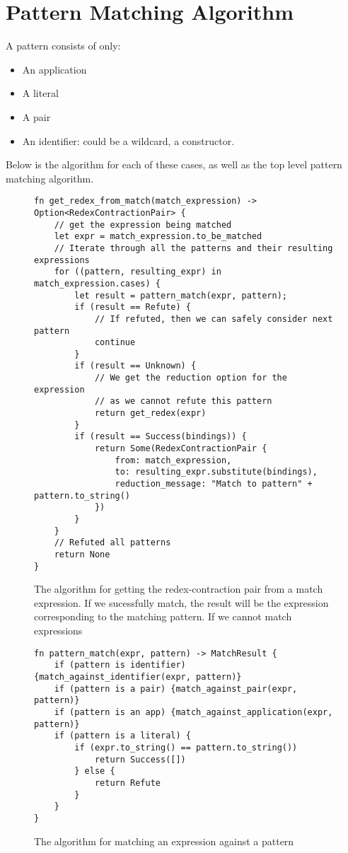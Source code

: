 \chapter{Pattern Matching Algorithm}
\label{appx:pattern_match}
A pattern consists of only:
\begin{itemize}
    \item An application
    \item A literal
    \item A pair
    \item An identifier: could be a wildcard, a constructor.
\end{itemize}

Below is the algorithm for each of these cases, as well as the top level pattern matching algorithm. 

\begin{figure}[h]
    \begin{lstlisting}[language=Rust_boxed]
fn get_redex_from_match(match_expression) -> Option<RedexContractionPair> {
    // get the expression being matched
    let expr = match_expression.to_be_matched
    // Iterate through all the patterns and their resulting expressions
    for ((pattern, resulting_expr) in match_expression.cases) {
        let result = pattern_match(expr, pattern);
        if (result == Refute) {
            // If refuted, then we can safely consider next pattern
            continue
        }
        if (result == Unknown) {
            // We get the reduction option for the expression
            // as we cannot refute this pattern
            return get_redex(expr)
        }
        if (result == Success(bindings)) {
            return Some(RedexContractionPair {
                from: match_expression,
                to: resulting_expr.substitute(bindings),
                reduction_message: "Match to pattern" + pattern.to_string()
            })
        }
    }
    // Refuted all patterns
    return None
}
\end{lstlisting}
    \caption{The algorithm for getting the redex-contraction pair from a match expression. If we sucessfully match, the result will be the expression corresponding to the matching pattern. If we cannot match expressions}
    \label{fig:all_pattern_list_iterate}
\end{figure}

\begin{figure}[h]
    \begin{lstlisting}[language=Rust_boxed]
fn pattern_match(expr, pattern) -> MatchResult {
    if (pattern is identifier) {match_against_identifier(expr, pattern)}
    if (pattern is a pair) {match_against_pair(expr, pattern)}
    if (pattern is an app) {match_against_application(expr, pattern)}
    if (pattern is a literal) {
        if (expr.to_string() == pattern.to_string()) 
            return Success([])
        } else {
            return Refute
        }
    }
}
\end{lstlisting}
    \caption{The algorithm for matching an expression against a pattern}
    \label{fig:pattern_list_top_level}
\end{figure}

